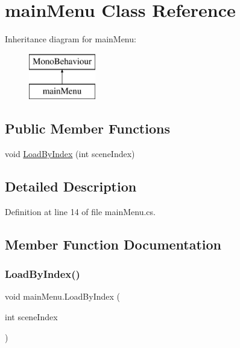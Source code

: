 \hypertarget{classmain_menu}{}\section{main\+Menu Class Reference}
\label{classmain_menu}
Inheritance diagram for main\+Menu\+:\begin{figure}[H]
\begin{center}
\leavevmode
\includegraphics[height=2.000000cm]{classmain_menu}
\end{center}
\end{figure}
\subsection*{Public Member Functions}
\begin{DoxyCompactItemize}
\item 
void \hyperlink{classmain_menu_a5d0b07e8c78863bec5331fa1f307654d}{Load\+By\+Index} (int scene\+Index)
\end{DoxyCompactItemize}


\subsection{Detailed Description}


Definition at line 14 of file main\+Menu.\+cs.



\subsection{Member Function Documentation}
\hypertarget{classmain_menu_a5d0b07e8c78863bec5331fa1f307654d}{}\label{classmain_menu_a5d0b07e8c78863bec5331fa1f307654d} 
\subsubsection{\texorpdfstring{Load\+By\+Index()}{LoadByIndex()}}
{\footnotesize\ttfamily void main\+Menu.\+Load\+By\+Index (\begin{DoxyParamCaption}\item[{int}]{scene\+Index }\end{DoxyParamCaption})}

